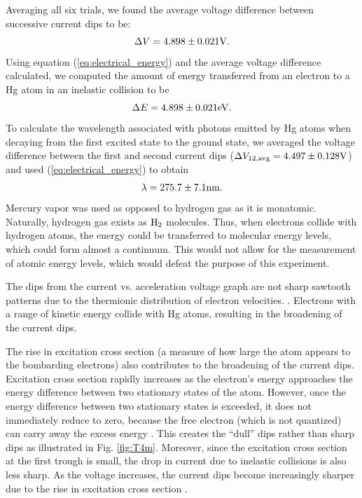 \documentclass[12pt]{article}
\begin{document}
Averaging all six trials, we found the average voltage difference between successive current dips to be:
\begin{equation}
    \Delta V = 4.898 \pm 0.021 \rm V.
\end{equation}
Using equation (\ref{eq:electrical_energy}) and the average voltage difference calculated, we computed the amount of energy transferred from an electron to a Hg atom in an inelastic collision to be 
\begin{equation}
    \Delta E = 4.898 \pm 0.021 \rm eV.
\end{equation}
To calculate the wavelength associated with photons emitted by Hg atoms when decaying from the first excited state to the ground state, we averaged the voltage difference between the first and second current dips ($\Delta V_{\rm 12, avg} = 4.497 \pm 0.128 \rm V$) and used (\ref{eq:electrical_energy}) to obtain
\begin{equation}
    \lambda = 275.7 \pm 7.1 \rm nm.
\end{equation}
Mercury vapor was used as opposed to hydrogen gas as it is monatomic. Naturally, hydrogen gas exists as $\rm H_2$ molecules. Thus, when electrons collide with hydrogen atoms, the energy could be transferred to molecular energy levels, which could form almost a continuum. This would not allow for the measurement of atomic energy levels, which would defeat the purpose of this experiment.

The dips from the current vs. acceleration voltage graph are not sharp sawtooth patterns due to the thermionic distribution of electron velocities. \autocite{franckhertz_mit}. Electrons with a range of kinetic energy collide with Hg atoms, resulting in the broadening of the current dips. 
    
The rise in excitation cross section (a measure of how large the atom appears to the bombarding electrons) also contributes to the broadening of the current dips. Excitation cross section rapidly increases as the electron's energy approaches the energy difference between two stationary states of the atom. However, once the energy difference between two stationary states is exceeded, it does not immediately reduce to zero, because the free electron (which is not quantized) can carry away the excess energy \autocite{franckhertz_washington}. This creates the \enquote{dull} dips rather than sharp dips as illustrated in Fig. \ref{fig:T4m}. Moreover, since the excitation cross section at the first trough is small, the drop in current due to inelastic collisions is also less sharp. As the voltage increases, the current dips become increasingly sharper due to the rise in excitation cross section \autocite{franckhertz_washington}.
\end{document}
